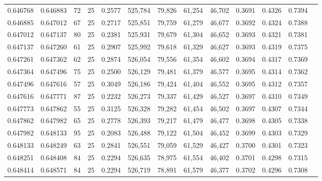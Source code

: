 \begin{tabular}{rrrrrrrrrrrrr}
0.646768 & 0.646883 &    72 &  25 &                                     0.2577 & 525,784 &  79,826 &  61,254 &  46,702 & 0.3691 & 0.4326 & 0.7394 \\
0.646885 & 0.647012 &    67 &  25 &                                     0.2717 & 525,851 &  79,759 &  61,279 &  46,677 & 0.3692 & 0.4324 & 0.7388 \\
0.647012 & 0.647137 &    80 &  25 &                                     0.2381 & 525,931 &  79,679 &  61,304 &  46,652 & 0.3693 & 0.4321 & 0.7381 \\
0.647137 & 0.647260 &    61 &  25 &                                     0.2907 & 525,992 &  79,618 &  61,329 &  46,627 & 0.3693 & 0.4319 & 0.7375 \\
0.647261 & 0.647362 &    62 &  25 &                                     0.2874 & 526,054 &  79,556 &  61,354 &  46,602 & 0.3694 & 0.4317 & 0.7369 \\
0.647364 & 0.647496 &    75 &  25 &                                     0.2500 & 526,129 &  79,481 &  61,379 &  46,577 & 0.3695 & 0.4314 & 0.7362 \\
0.647496 & 0.647616 &    57 &  25 &                                     0.3049 & 526,186 &  79,424 &  61,404 &  46,552 & 0.3695 & 0.4312 & 0.7357 \\
0.647616 & 0.647771 &    87 &  25 &                                     0.2232 & 526,273 &  79,337 &  61,429 &  46,527 & 0.3697 & 0.4310 & 0.7349 \\
0.647773 & 0.647862 &    55 &  25 &                                     0.3125 & 526,328 &  79,282 &  61,454 &  46,502 & 0.3697 & 0.4307 & 0.7344 \\
0.647862 & 0.647982 &    65 &  25 &                                     0.2778 & 526,393 &  79,217 &  61,479 &  46,477 & 0.3698 & 0.4305 & 0.7338 \\
0.647982 & 0.648133 &    95 &  25 &                                     0.2083 & 526,488 &  79,122 &  61,504 &  46,452 & 0.3699 & 0.4303 & 0.7329 \\
0.648133 & 0.648249 &    63 &  25 &                                     0.2841 & 526,551 &  79,059 &  61,529 &  46,427 & 0.3700 & 0.4301 & 0.7323 \\
0.648251 & 0.648408 &    84 &  25 &                                     0.2294 & 526,635 &  78,975 &  61,554 &  46,402 & 0.3701 & 0.4298 & 0.7315 \\
0.648414 & 0.648571 &    84 &  25 &                                     0.2294 & 526,719 &  78,891 &  61,579 &  46,377 & 0.3702 & 0.4296 & 0.7308 \\

\end{tabular}
